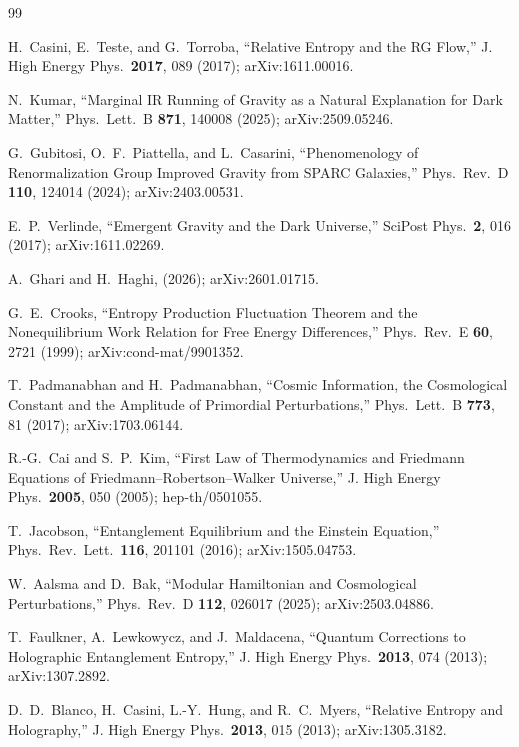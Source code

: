 \documentclass[aps,prd,preprint,superscriptaddress,longbibliography]{revtex4-2}
\begin{document}
\begin{thebibliography}{99}

H.~Casini, E.~Teste, and G.~Torroba,
``Relative Entropy and the RG Flow,''
J. High Energy Phys.\ \textbf{2017}, 089 (2017);
arXiv:1611.00016.

N.~Kumar,
``Marginal IR Running of Gravity as a Natural Explanation for
Dark Matter,''
Phys.\ Lett.\ B \textbf{871}, 140008 (2025);
arXiv:2509.05246.

G.~Gubitosi, O.~F.~Piattella, and L.~Casarini,
``Phenomenology of Renormalization Group Improved Gravity from
SPARC Galaxies,''
Phys.\ Rev.\ D \textbf{110}, 124014 (2024);
arXiv:2403.00531.

E.~P.~Verlinde,
``Emergent Gravity and the Dark Universe,''
SciPost Phys.\ \textbf{2}, 016 (2017);
arXiv:1611.02269.

A.~Ghari and H.~Haghi,
(2026); arXiv:2601.01715.

G.~E.~Crooks,
``Entropy Production Fluctuation Theorem and the Nonequilibrium
Work Relation for Free Energy Differences,''
Phys.\ Rev.\ E \textbf{60}, 2721 (1999);
arXiv:cond-mat/9901352.

T.~Padmanabhan and H.~Padmanabhan,
``Cosmic Information, the Cosmological Constant and the Amplitude
of Primordial Perturbations,''
Phys.\ Lett.\ B \textbf{773}, 81 (2017);
arXiv:1703.06144.

R.-G.~Cai and S.~P.~Kim,
``First Law of Thermodynamics and Friedmann Equations of
Friedmann--Robertson--Walker Universe,''
J. High Energy Phys.\ \textbf{2005}, 050 (2005);
hep-th/0501055.

T.~Jacobson,
``Entanglement Equilibrium and the Einstein Equation,''
Phys.\ Rev.\ Lett.\ \textbf{116}, 201101 (2016);
arXiv:1505.04753.

W.~Aalsma and D.~Bak,
``Modular Hamiltonian and Cosmological Perturbations,''
Phys.\ Rev.\ D \textbf{112}, 026017 (2025);
arXiv:2503.04886.

T.~Faulkner, A.~Lewkowycz, and J.~Maldacena,
``Quantum Corrections to Holographic Entanglement Entropy,''
J. High Energy Phys.\ \textbf{2013}, 074 (2013);
arXiv:1307.2892.

D.~D.~Blanco, H.~Casini, L.-Y.~Hung, and R.~C.~Myers,
``Relative Entropy and Holography,''
J. High Energy Phys.\ \textbf{2013}, 015 (2013);
arXiv:1305.3182.


\end{thebibliography}
\end{document}

